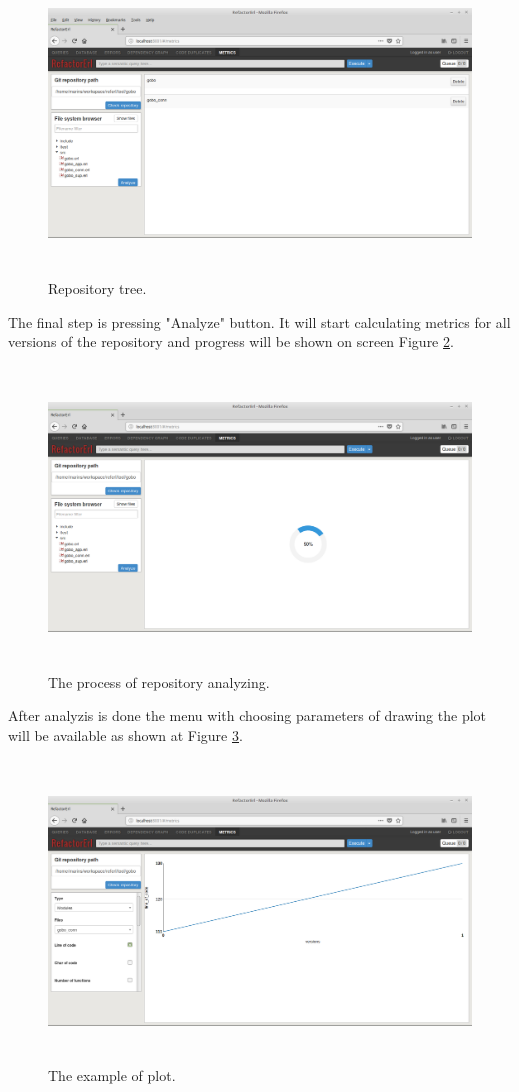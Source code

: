 \begin{figure}[h]
	\includegraphics[height=80mm]{figures/files.png}
	\caption{Repository tree.}
	\label{fig:metrics_files}
\end{figure}

The final step is pressing "Analyze" button. It will start calculating metrics for all versions of the repository and progress will be shown on screen Figure \ref{fig:metrics_analyze}. 

\begin{figure}[h]
	\includegraphics[height=80mm]{figures/analyze.png}
	\caption{The process of repository analyzing.}
	\label{fig:metrics_analyze}
\end{figure}

After analyzis is done the menu with choosing parameters of drawing the plot will be available as shown at Figure \ref{fig:metrics_plot}.

\begin{figure}[h]
	\includegraphics[height=80mm]{figures/plot.png}
	\caption{The example of plot.}
	\label{fig:metrics_plot}
\end{figure}